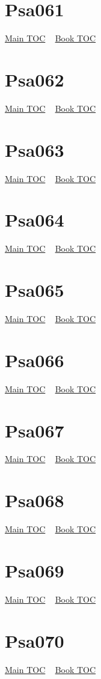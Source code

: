 \documentclass{book}
\begin{document}
  \section{Psa061}\hyperlink{toc}{Main TOC} ~ \hyperref[subsec:Psa]{Book TOC} 
  \section{Psa062}\hyperlink{toc}{Main TOC} ~ \hyperref[subsec:Psa]{Book TOC} 
  \section{Psa063}\hyperlink{toc}{Main TOC} ~ \hyperref[subsec:Psa]{Book TOC} 
  \section{Psa064}\hyperlink{toc}{Main TOC} ~ \hyperref[subsec:Psa]{Book TOC} 
  \section{Psa065}\hyperlink{toc}{Main TOC} ~ \hyperref[subsec:Psa]{Book TOC} 
  \section{Psa066}\hyperlink{toc}{Main TOC} ~ \hyperref[subsec:Psa]{Book TOC} 
  \section{Psa067}\hyperlink{toc}{Main TOC} ~ \hyperref[subsec:Psa]{Book TOC} 
  \section{Psa068}\hyperlink{toc}{Main TOC} ~ \hyperref[subsec:Psa]{Book TOC} 
  \section{Psa069}\hyperlink{toc}{Main TOC} ~ \hyperref[subsec:Psa]{Book TOC} 
  \section{Psa070}\hyperlink{toc}{Main TOC} ~ \hyperref[subsec:Psa]{Book TOC} 
\end{document}
